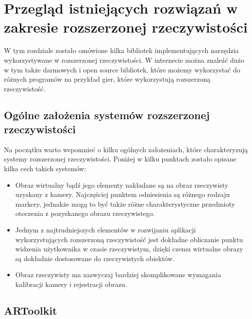 \chapter{Przegląd istniejących rozwiązań w zakresie rozszerzonej rzeczywistości}
\label{cha:przegladIstniejacychRozwiazanWZakresieRozszerzonejRzeczywistosci}

W tym rozdziale zostało omówione kilka bibliotek implementujących narzędzia wykorzystywane w rozszerzonej rzeczywistości. W internecie można znaleźć dużo w tym także darmowych i open source bibliotek, które możemy wykorzystać do różnych programów na przykład gier, które wykorzystują rozszerzoną rzeczywistość.


\section{Ogólne założenia systemów rozszerzonej rzeczywistości}
\label{sec:ogolneZalozeniaSystemowRozszerzonejRzeczywistosci}

Na początku warto wspomnieć o kilku ogólnych założeniach, które charakteryzują systemy rozszerzonej rzeczywistości. Poniżej w kilku punktach zostało opisane kilka cech takich systemów:
\begin{itemize}
	\item Obraz wirtualny bądź jego elementy nakładane są na obraz rzeczywisty uzyskany z kamery. Najczęściej punktem odniesienia są różnego rodzaju markery, jednakże mogą to być także różne charakterystyczne przedmioty otoczenia z pozyskanego obrazu rzeczywistego.
	\item Jednym z najtrudniejszych elementów w rozwijaniu aplikacji wykorzystujących rozszerzoną rzeczywistość jest dokładne obliczanie punktu widzenia użytkownika w czasie rzeczywistym, dzięki czemu wirtualne obrazy są dokładnie dostosowane do rzeczywistych obiektów.
	\item Obraz rzeczywisty ma zazwyczaj bardziej skomplikowane wymagania kalibracji kamery i rejestracji obrazu.
\end{itemize}


\section{ARToolkit}
\label{sec:artoolkit}


